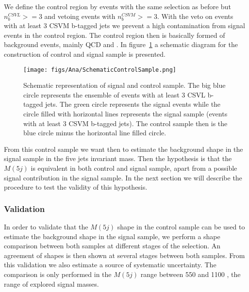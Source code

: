 We define the control region by events with the same selection as before but $n_{b}^{CSVL}>=3$ and vetoing events with $n_{b}^{CSVM}>=3$. With the veto on events with at least 3 CSVM b-tagged jets we prevent a high contamination from signal events in the control region. The control region then is basically formed of background events, mainly QCD and \ttbar. In figure~\ref{fig:CSSSSche} a schematic diagram for the construction of control and signal sample is presented.

\begin{figure}[!Hhtbp]
  \begin{center}
    \texttt{[image: figs/Ana/SchematicControlSample.png]}
    \caption{Schematic representation of signal and control sample. The big blue circle represents the ensemble of events with at least 3 CSVL b-tagged jets. The green circle represents the signal events while the circle filled with horizontal lines represents the signal sample (events with at least 3 CSVM b-tagged jets). The control sample then is the blue circle minus the horizontal line filled circle.}
    \label{fig:CSSSSche}
  \end{center}
\end{figure}

From this control sample we want then to estimate the background shape in the signal sample in the five jets invariant mass. Then the hypothesis is that the $M(5j)$ is equivalent in both control and signal sample, apart from a possible signal contribution in the signal sample. In the next section we will describe the procedure to test the validity of this hypothesis. 

\subsubsection{Validation}
\label{sec:validation}

In order to validate that the $M(5j)$ shape in the control sample can be used to estimate the background shape in the signal sample, we perform a shape comparison between both samples at different stages of the selection. An agreement of shapes is then shown at several stages between both samples. From this validation we also estimate a source of systematic uncertainty. The comparison is only performed in the $M(5j)$ range between 550 and 1100 \GeVcc, the range of explored signal masses.

